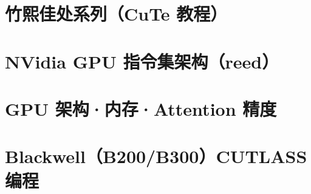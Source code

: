 \documentclass[9pt,openany]{ctexbook}
\begin{document}
\part{竹熙佳处系列（CuTe 教程）}









\part{NVidia GPU 指令集架构（reed）}










\part{GPU 架构·内存·Attention 精度}






\part{Blackwell（B200/B300）CUTLASS 编程}





\end{document}
